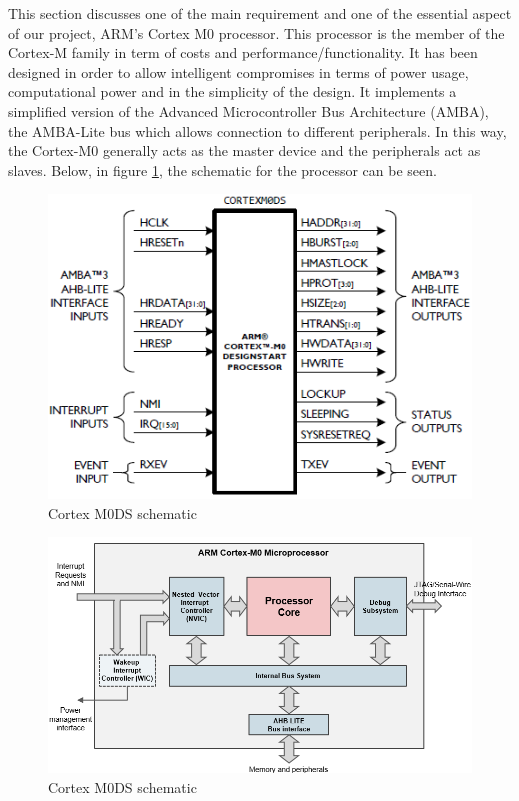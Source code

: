 

This section discusses one of the main requirement and one of the essential aspect of our project, ARM’s Cortex M0 processor. This processor is the member of the Cortex-M family in term of costs and performance/functionality. It has been designed in order to allow intelligent compromises in terms of power usage, computational power and in the simplicity of the design. It implements a simplified version of the Advanced Microcontroller Bus Architecture (AMBA), the AMBA-Lite bus which allows connection to different peripherals. In this way, the Cortex-M0 generally acts as the master device and the peripherals act as slaves. Below, in figure \ref{fig:cortexm0ds}, the schematic for the processor can be seen.\\
\begin{figure}
\centering
\includegraphics[scale=0.7]{figures/cortexm0ds_schematic.PNG}
\caption{Cortex M0DS schematic \label{fig:cortexm0ds}}
\end{figure}
\clearpage

\begin{figure}
\centering
\includegraphics[scale=0.7]{figures/arm_cortexm0_microprocessor.PNG}
\caption{Cortex M0DS schematic \label{fig:cortex_block}}
\end{figure}

